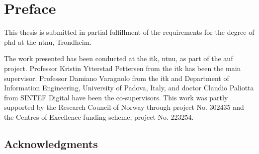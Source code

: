 \chapter*{Preface}

This thesis is submitted in partial fulfillment of the requirements for the degree of \gls{phd} at the \gls{ntnu}, Trondheim.

The work presented has been conducted at the \gls{itk}, \gls{ntnu}, as part of the \gls{auf} project.
Professor Kristin Ytterstad Pettersen from the \gls{itk} has been the main supervisor. 
Professor Damiano Varagnolo from the \gls{itk} and Department of Information Engineering, University of Padova, Italy, and doctor Claudio Paliotta from SINTEF Digital have been the co-supervisors.
This work was partly supported by the Research Council of Norway through project No. 302435 and the Centres of Excellence funding scheme, project No. 223254.

\section*{Acknowledgments}

